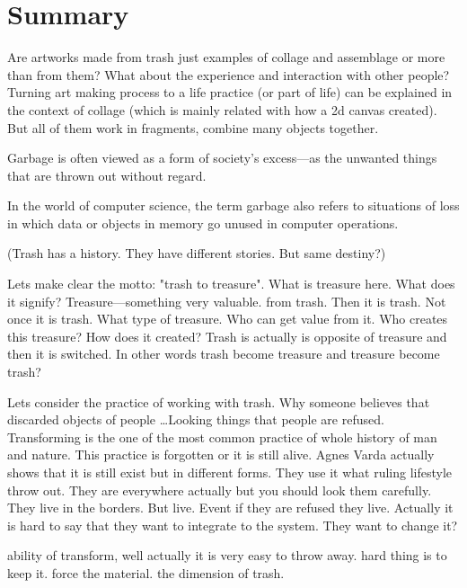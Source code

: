 

\section{Summary}
Are artworks made from trash just examples of collage and assemblage or more than from them? What about the experience and interaction with other people? Turning art making process to a life practice (or part of life) can be explained in the context of collage (which is mainly related with how a 2d canvas created). But all of them work in fragments, combine many objects together. 

Garbage is often viewed as a form of society’s excess---as the unwanted things that are thrown out without regard. 

In the world of computer science, the term garbage also refers to situations of loss in which data or objects in memory go unused in computer operations.

(Trash has a history. They have different stories. But same destiny?)

Lets make clear the motto: "trash to treasure". What is treasure here. What does it signify? Treasure---something very valuable. from trash. Then it is trash. Not once it is trash. What type of treasure. Who can get value from it. Who creates this treasure? How does it created? Trash is actually is opposite of treasure and then it is switched. In other words trash become treasure and treasure become trash?

Lets consider the practice of working with trash. Why someone believes that discarded objects of people \ldots Looking things that people are refused. Transforming is the one of the most common practice of whole history of man and nature. This practice is forgotten or it is still alive. Agnes Varda actually shows that it is still exist but in different forms. They use it what ruling lifestyle throw out. They are everywhere actually but you should look them carefully. They live in the borders. But live. Event if they are refused they live. Actually it is hard to say that they want to integrate to the system. They want to change it? 

ability of transform, well actually it is very easy to throw away. hard thing is to keep it. force the material. the dimension of trash.


